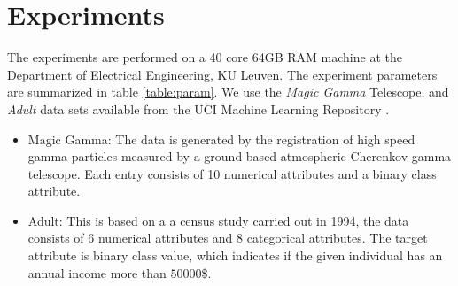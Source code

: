 \documentclass[conference, cmex10]{IEEEtran}
\begin{document}
\section{Experiments} \label{exp}

The experiments are performed on a 40 core 64GB RAM machine at the Department of Electrical Engineering, KU Leuven. The experiment parameters are summarized in table \ref{table:param}. We use the \textit{Magic Gamma} Telescope, and \textit{Adult} data sets available from the UCI Machine Learning Repository \cite{Lichman:2013}. 

\begin{itemize}
\item Magic Gamma: The data is generated by the registration of high speed gamma particles measured by a ground based atmospheric Cherenkov gamma telescope. Each entry consists of 10 numerical attributes and a binary class attribute. 
\item Adult: This is based on a a census study carried out in 1994, the data consists of 6 numerical attributes and 8 categorical attributes. The target attribute is binary class value, which indicates if the given individual has an annual income more than $50 000$\$.
\end{itemize}
\end{document}

